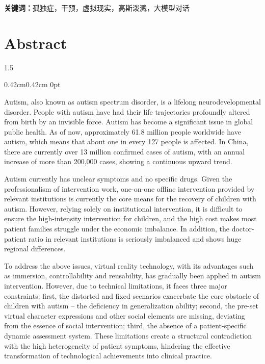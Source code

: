 \documentclass[zihao=-4]{ctexart}
\newcommand{\setParDis}{\setlength {\parskip} {0pt} }
\begin{document}
\textbf{关键词：}孤独症，干预，虚拟现实，高斯泼溅，大模型对话

\newpage
\section*{\textbf{Abstract}} %
\begin{spacing}{1.5}
\begin{adjustwidth}{0.42cm}{0.42cm}
    \sloppy
  \setParDis %

Autism, also known as autism spectrum disorder, is a lifelong neurodevelopmental disorder. People with autism have had their life trajectories profoundly altered from birth by an invisible force. Autism has become a significant issue in global public health. As of now, approximately 61.8 million people worldwide have autism, which means that about one in every 127 people is affected. In China, there are currently over 13 million confirmed cases of autism, with an annual increase of more than 200,000 cases, showing a continuous upward trend.

Autism currently has unclear symptoms and no specific drugs. Given the professionalism of intervention work, one-on-one offline intervention provided by relevant institutions is currently the core means for the recovery of children with autism. However, relying solely on institutional intervention, it is difficult to ensure the high-intensity intervention for children, and the high cost makes most patient families struggle under the economic imbalance. In addition, the doctor-patient ratio in relevant institutions is seriously imbalanced and shows huge regional differences.

To address the above issues, virtual reality technology, with its advantages such as immersion, controllability and reusability, has gradually been applied in autism intervention. However, due to technical limitations, it faces three major constraints: first, the distorted and fixed scenarios exacerbate the core obstacle of children with autism -- the deficiency in generalization ability; second, the pre-set virtual character expressions and other social elements are missing, deviating from the essence of social intervention; third, the absence of a patient-specific dynamic assessment system. These limitations create a structural contradiction with the high heterogeneity of patient symptoms, hindering the effective transformation of technological achievements into clinical practice.


\end{adjustwidth}
\end{spacing}
\end{document}
